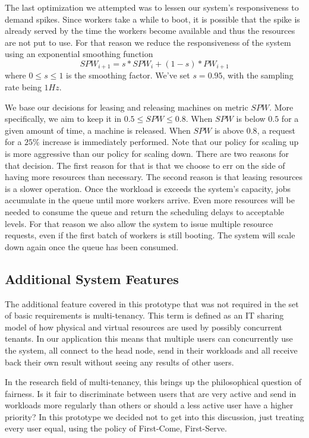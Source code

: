 \documentclass{stylesheet}
\begin{document}
The last optimization we attempted was to lessen our system's responsiveness to demand spikes. Since workers take a while to boot, it is possible that the spike is already served by the time the workers become available and thus the resources are not put to use. For that reason we reduce the responsiveness of the system using an exponential smoothing function
$$SPW_{i+1} = s*SPW_{i} + (1-s)*PW_{i+1}$$ where $0 \leq s \leq 1$ is the smoothing factor. We've set $s=0.95$, with the sampling rate being $1Hz$.

We base our decisions for leasing and releasing machines on metric $SPW$. More specifically, we aim to keep it in $0.5 \leq SPW \leq 0.8$. When $SPW$ is below $0.5$ for a given amount of time, a machine is released. When $SPW$ is above $0.8$, a request for a $25\%$ increase is immediately performed. Note that our policy for scaling up is more aggressive than our policy for scaling down. There are two reasons for that decision. The first reason for that is that we choose to err on the side of having more resources than necessary. The second reason is that leasing resources is a slower operation. Once the workload is exceeds the system's capacity, jobs accumulate in the queue until more workers arrive. Even more resources will be needed to consume the queue and return the scheduling delays to acceptable levels. For that reason we also allow the system to issue multiple resource requests, even if the first batch of workers is still booting. The system will scale down again once the queue has been consumed.

\subsection{Additional System Features}
\label{subsec:additionalFeatures}
The additional feature covered in this prototype that was not required in the set of basic requirements is multi-tenancy. This term is defined as an IT sharing model of how physical and virtual resources are used by possibly concurrent tenants. In our application this means that multiple users can concurrently use the system, all connect to the head node, send in their workloads and all receive back their own result without seeing any results of other users.

In the research field of multi-tenancy, this brings up the philosophical question of fairness. Is it fair to discriminate between users that are very active and send in workloads more regularly than others or should a less active user have a higher priority? In this prototype we decided not to get into this discussion, just treating every user equal, using the policy of First-Come, First-Serve.
\end{document}
